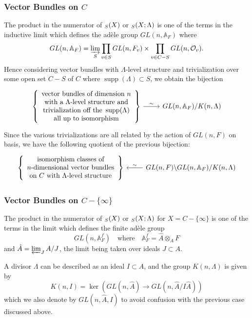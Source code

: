 \documentclass[12pt,a4paper]{article}
\theoremstyle{plain}
\theoremstyle{definition}
\theoremstyle{remark}
\newcommand{\bA}{\mathbb{A}}
\newcommand{\cO}{\mathcal{O}}
\providecommand{\cO}{\mathcal{O}}
\providecommand{\supp}{\operatorname{supp}}
\let\Vec\relax
\DeclareMathOperator{\Vec}{Vec}
\begin{document}
\subsubsection*{Vector Bundles on $C$}

The product in the numerator of $\Vec_S(X)$ or $\Vec_S(X; \Lambda)$ is one of the terms in the inductive limit which defines the ad\`ele group $GL(n, \bA_F)$ where
\[
GL(n, \bA_F) = \varinjlim_{S} \prod_{v \in S} GL(n, F_v) \times \prod_{v \in C - S} GL(n, \cO_v).
\]
Hence considering vector bundles with $\Lambda$-level structure and trivialization over some open set $C - S$ of $C$ where $\supp(\Lambda) \subset S$, we obtain the bijection
\[
\begin{tikzcd}
\left\{\begin{array}{c}
\text{vector bundles of dimension } n \\
\text{with a } \Lambda\text{-level structure and} \\
\text{trivialization off the } \supp(\Lambda) \\
\text{all up to isomorphism}
\end{array}\right\} \arrow[r, "\sim"] & GL(n, \bA_F)/K(n, \Lambda)
\end{tikzcd}
\]
Since the various trivializations are all related by the action of $GL(n, F)$ on basis, we have the following quotient of the previous bijection:
\[
\begin{tikzcd}
\left\{\begin{array}{c}
\text{isomorphism classes of} \\
n\text{-dimensional vector bundles} \\
\text{on } C \text{ with } \Lambda\text{-level structure}
\end{array}\right\} & GL(n, F) \backslash GL(n, \bA_F) / K(n, \Lambda) \arrow[l, "\sim"']
\end{tikzcd}
\]

\subsubsection*{Vector Bundles on $C - \{\infty\}$}

The product in the numerator of $\Vec_S(X)$ or $\Vec_S(X; \Lambda)$ for $X = C - \{\infty\}$ is one of the terms in the limit which defines the finite ad\`ele group
\[
GL(n, \bA_F^f) \quad \text{where} \quad \bA_F^f = \hat{A} \otimes_A F
\]
and $\hat{A} = \varprojlim_J A/J$, the limit being taken over ideals $J \subset A$.

A divisor $\Lambda$ can be described as an ideal $I \subset A$, and the group $K(n, \Lambda)$ is given by
\[
K(n, I) = \ker(GL(n, \hat{A}) \to GL(n, \hat{A}/I\hat{A}))
\]
which we also denote by $GL(n, \hat{A}, I)$ to avoid confusion with the previous case discussed above.
\end{document}
